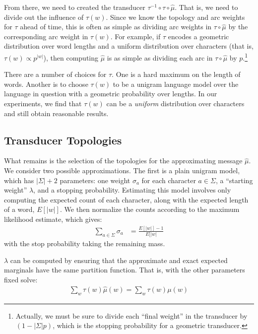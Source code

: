 \documentclass[11pt,a4paper]{article}
\begin{document}
From there, we need to created the transducer
$\tau^{-1}\circ\tau\circ\hat\mu$. That is, we need to divide out
the influence of $\tau(w)$. Since we know the topology and arc
weights for $\tau$ ahead of time, this is often as simple as dividing
arc weights in $\tau\circ\hat\mu$ by the corresponding arc weight
in $\tau(w)$. For example, if $\tau$ encodes a geometric distribution
over word lengths and a uniform distribution over characters (that
is, $\tau(w) \propto {p^{|w|}}$), then computing $\hat\mu$ is as
simple as dividing each arc in $\tau\circ\hat\mu$ by
$p$.\footnote{Actually, we must be sure to divide each ``final
weight'' in the transducer by $(1-|\Sigma| p)$, which is the stopping
probability for a geometric transducer.}

There are a number of choices for $\tau$. One is a hard maximum on the
length of words. Another is to choose $\tau(w)$ to be a unigram
language model over the language in question with a geometric
probability over lengths. In our experiments, we find that $\tau(w)$
can be a \textit{uniform} distribution over characters and still
obtain reasonable results.

\subsection{Transducer Topologies}

What remains is the selection of the topologies for the approximating
message $\hat\mu$. We consider two possible approximations. The
first is a plain unigram model, which has $|\Sigma|+2$ parameters:
one weight $\sigma_a$ for each character $a \in \Sigma$, a ``starting weight'' $\lambda$, and
a stopping probability. Estimating this model involves only computing
the expected count of each character, along with the expected
length of a word, $E[|w|]$. We then normalize the counts according
to the maximum likelihood estimate, which gives:
\begin{equation}
  \begin{split}
    \sum_{a\in\Sigma} \sigma_a &= \frac{E[|w|]-1}{E[|w|}
   \end{split}
 \end{equation}
with the stop probability taking the remaining mass. 

$\lambda$ can be computed by ensuring that the
approximate and exact expected marginals have the same partition
function. That is, with the other parameters fixed solve:
\begin{equation*}
  \begin{split}
    \sum_w \tau(w) \hat\mu(w) = \sum_w \tau(w) \mu(w)
  \end{split}
\end{equation*}
\end{document}
